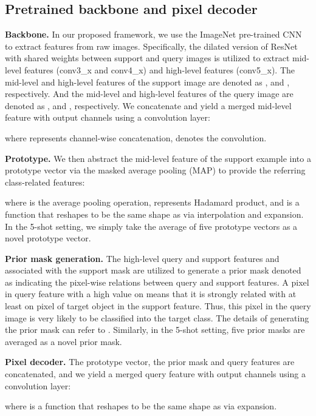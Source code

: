 \documentclass[journal]{IEEEtran}
\begin{document}
\subsection{Pretrained backbone and pixel decoder}
\noindent \textbf{Backbone.}
In our proposed framework, we use the ImageNet\cite{deng2009} pre-trained CNN to extract features from raw images. Specifically, the dilated version of ResNet\cite{resnet} with shared weights between support and query images is utilized to extract mid-level features (conv3\_x and conv4\_x) and high-level features (conv5\_x). The mid-level and high-level features of the support image are denoted as ,  and , respectively. And the mid-level and high-level features of the query image are denoted as ,  and , respectively. We concatenate and yield a merged mid-level feature  with  output channels using a  convolution layer:

where  represents channel-wise concatenation,  denotes the  convolution. 

\noindent \textbf{Prototype.}
We then abstract the mid-level feature of the support example  into a prototype vector via the masked average pooling (MAP) to provide the referring class-related features:

where  is the average pooling operation,  represents Hadamard product, and  is a function that reshapes  to be the same shape as  via interpolation and expansion. In the 5-shot setting, we simply take the average of five prototype vectors as a novel prototype vector\cite{pfenet}.

\noindent \textbf{Prior mask generation.}
The high-level query and support features  and  associated with the support mask  are utilized to generate a prior mask denoted as  indicating the pixel-wise relations between query and support features. A pixel in query feature with a high value on  means that it is strongly related with at least on pixel of target object in the support feature. Thus, this pixel in the query image is very likely to be classified into the target class. The details of generating the prior mask can refer to \cite{pfenet}. Similarly, in the 5-shot setting, five prior masks are averaged as a novel prior mask.

\noindent \textbf{Pixel decoder.}
The prototype vector, the prior mask and query features are concatenated, and we yield a merged query feature with  output channels using a  convolution layer:

where  is a function that reshapes  to be the same shape as  via expansion.
\end{document}

